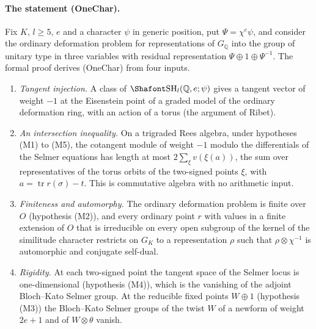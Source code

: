 \paragraph{The statement (OneChar).} Fix $K$, $l\ge5$, $e$ and a character $\psi$ in generic position, put $\Psi=\chi^e\psi$, and consider the ordinary deformation problem for representations of $G_{\mathbb Q}$ into the group of unitary type in three variables with residual representation $\Psi\oplus1\oplus\Psi^{-1}$. The formal proof derives (OneChar) from four inputs.
\begin{enumerate}[leftmargin=*,label=(G\arabic*)]
\item \emph{Tangent injection.} A class of $\Sha_l(\mathbb Q,e;\psi)$ gives a tangent vector of weight $-1$ at the Eisenstein point of a graded model of the ordinary deformation ring, with an action of a torus (the argument of Ribet).
\item \emph{An intersection inequality.} On a trigraded Rees algebra, under hypotheses (M1) to (M5), the cotangent module of weight $-1$ modulo the differentials of the Selmer equations has length at most $2\sum_\xi v(\xi(a))$, the sum over representatives of the torus orbits of the two-signed points $\xi$, with $a=\operatorname{tr}r(\sigma)-t$. This is commutative algebra with no arithmetic input.
\item \emph{Finiteness and automorphy.} The ordinary deformation problem is finite over $O$ (hypothesis (M2)), and every ordinary point $r$ with values in a finite extension of $O$ that is irreducible on every open subgroup of the kernel of the similitude character restricts on $G_K$ to a representation $\rho$ such that $\rho\otimes\chi^{-1}$ is automorphic and conjugate self-dual.
\item \emph{Rigidity.} At each two-signed point the tangent space of the Selmer locus is one-dimensional (hypothesis (M4)), which is the vanishing of the adjoint Bloch--Kato Selmer group. At the reducible fixed points $W\oplus1$ (hypothesis (M3)) the Bloch--Kato Selmer groups of the twist $W$ of a newform of weight $2e+1$ and of $W\otimes\theta$ vanish.
\end{enumerate}

